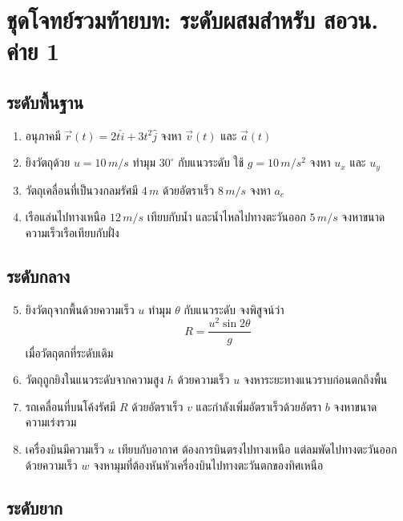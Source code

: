 \section{ชุดโจทย์รวมท้ายบท: ระดับผสมสำหรับ สอวน. ค่าย 1}

\subsection*{ระดับพื้นฐาน}

\begin{enumerate}
    \item อนุภาคมี $\vec{r}(t)=2t\hat{i}+3t^2\hat{j}$ จงหา $\vec{v}(t)$ และ $\vec{a}(t)$
    \item ยิงวัตถุด้วย $u=10\,\si{m/s}$ ทำมุม $30^\circ$ กับแนวระดับ ใช้ $g=10\,\si{m/s^2}$ จงหา $u_x$ และ $u_y$
    \item วัตถุเคลื่อนที่เป็นวงกลมรัศมี $4\,\si{m}$ ด้วยอัตราเร็ว $8\,\si{m/s}$ จงหา $a_c$
    \item เรือแล่นไปทางเหนือ $12\,\si{m/s}$ เทียบกับน้ำ และน้ำไหลไปทางตะวันออก $5\,\si{m/s}$ จงหาขนาดความเร็วเรือเทียบกับฝั่ง
\end{enumerate}

\subsection*{ระดับกลาง}

\begin{enumerate}
    \setcounter{enumi}{4}
    \item ยิงวัตถุจากพื้นด้วยความเร็ว $u$ ทำมุม $\theta$ กับแนวระดับ จงพิสูจน์ว่า
    \[
    R=\frac{u^2\sin2\theta}{g}
    \]
    เมื่อวัตถุตกที่ระดับเดิม

    \item วัตถุถูกยิงในแนวระดับจากความสูง $h$ ด้วยความเร็ว $u$ จงหาระยะทางแนวราบก่อนตกถึงพื้น

    \item รถเคลื่อนที่บนโค้งรัศมี $R$ ด้วยอัตราเร็ว $v$ และกำลังเพิ่มอัตราเร็วด้วยอัตรา $b$ จงหาขนาดความเร่งรวม

    \item เครื่องบินมีความเร็ว $u$ เทียบกับอากาศ ต้องการบินตรงไปทางเหนือ แต่ลมพัดไปทางตะวันออกด้วยความเร็ว $w$ จงหามุมที่ต้องหันหัวเครื่องบินไปทางตะวันตกของทิศเหนือ
\end{enumerate}

\subsection*{ระดับยาก}

